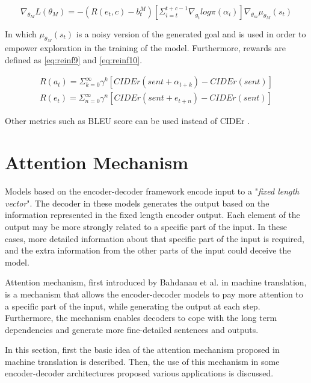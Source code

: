 \documentclass[preprint, 12pt]{elsarticle}
\begin{document}
		\begin{equation}
			\nabla_{\theta_M} L(\theta_M) = -(R(e_t, c) - b_t^M) [\Sigma_{i=t}^{t+c-1} \nabla_{g_t} log \pi(\alpha_i)] \nabla_{\theta_m} \mu_{\theta_M} (s_t)
			\label{eq:nabla}
		\end{equation}
		
		In which $\mu_{\theta_M} (s_t)$ is a noisy version of the generated goal and is used in order to empower exploration in the training of the model. Furthermore, rewards are defined as \eqref{eq:reinf9} and \eqref{eq:reinf10}.
		
		\begin{align}
			R(a_t) = \Sigma_{k=0}^\infty \gamma^k [CIDEr(sent + \alpha_{t+k}) - CIDEr(sent)] \label{eq:reinf9} \\
			R(e_t) = \Sigma_{n=0}^\infty \gamma^n [CIDEr(sent + e_{t+n}) - CIDEr(sent)] \label{eq:reinf10} 
		\end{align}
		
		Other metrics such as BLEU score can be used instead of CIDEr \cite{papineni2002bleu}.
		
	\section{Attention Mechanism}
		Models based on the encoder-decoder framework encode input to a "\textit{fixed length vector}". The decoder in these models generates the output based on the information represented in the fixed length encoder output. Each element of the output may be more strongly related to a specific part of the input. In these cases, more detailed information about that specific part of the input is required, and the extra information from the other parts of the input could deceive the model. 
		
		Attention mechanism, first introduced by Bahdanau et al. \cite{bahdanau2014neural} in machine translation, is a mechanism that allows the encoder-decoder models to pay more attention to a specific part of the input, while generating the output at each step. Furthermore, the mechanism enables decoders to cope with the long term dependencies and generate more fine-detailed sentences and outputs.
		
		In this section, first the basic idea of the attention mechanism proposed in machine translation is described. Then, the use of this mechanism in some encoder-decoder architectures proposed various applications is discussed.
		
\end{document}
